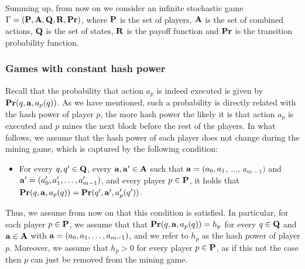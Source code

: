 Summing up, from now on we consider an infinite stochastic game $\Gamma = (\mathbf{P},\mathbf{A},\mathbf{Q},\mathbf{R},\mathbf{Pr})$, where $\mathbf{P}$ is the set of players, $\mathbf{A}$ is the set of combined actions, $\mathbf{Q}$ is the set of states, $\mathbf{R}$ is the payoff function and $\mathbf{Pr}$ is the transition probability function.

\subsubsection{Games with constant hash power}
Recall that the probability that action $a_p$ is indeed executed is given by $\mathbf{Pr}(q, \mathbf{a}, a_p(q))$. As we have mentioned, such a probability is directly related with the hash power of player $p$, the more hash power the likely it is that action $a_p$ is executed and $p$ mines the next block before the rest of the players. In what follows, we assume that the hash power of each player does not change during the mining game, which is captured by the following condition:
\begin{itemize}
\item For every $q, q' \in \mathbf{Q}$, every $\mathbf{a}, \mathbf{a}' \in \mathbf{A}$ such that $\mathbf{a} = (a_0, a_1$, $\ldots$, $a_{m-1})$ and $\mathbf{a}' = (a'_0, a'_1, \ldots, a'_{m-1})$,  and every player $p \in \mathbf{P}$, it holds that $\mathbf{Pr}(q, \mathbf{a}, a_p(q)) = \mathbf{Pr}(q', \mathbf{a}', a'_p(q'))$.
\end{itemize}
Thus, we assume from now on that this condition is satisfied. In particular, for each player $p \in \mathbf{P}$, we assume that that 
$\mathbf{Pr}(q, \mathbf{a}, a_p(q)) = h_p$ for every $q \in \mathbf{Q}$ and $\mathbf{a} \in \mathbf{A}$ with $\mathbf{a} = (a_0, a_1, \ldots, a_{m-1})$, and we refer to $h_p$ as the hash power of player $p$. 
Moreover, we assume that $h_p > 0$ for every player $p \in \mathbf{P}$, as if this not the case then $p$ can just be removed from the mining game. 

